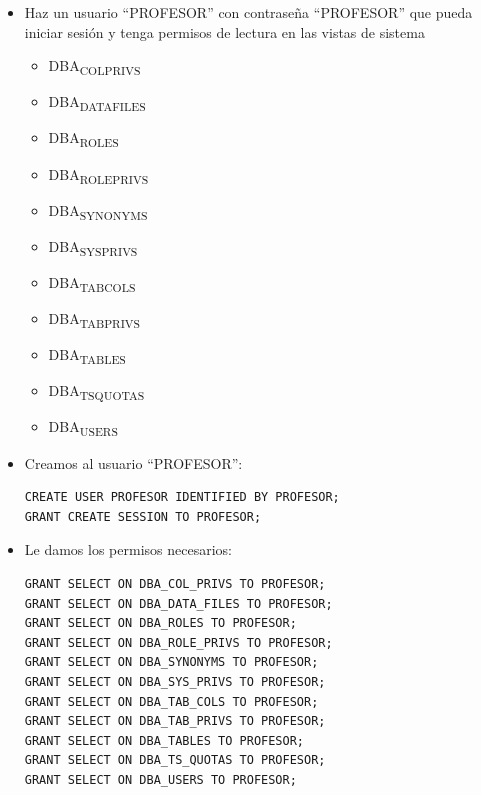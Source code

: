 \documentclass[11pt]{article}
\begin{document}
\begin{itemize}
\item Haz un usuario ``PROFESOR'' con contraseña ``PROFESOR'' que pueda iniciar sesión y tenga permisos de lectura en las vistas de sistema
\begin{itemize}
\item DBA\textsubscript{COL}\textsubscript{PRIVS}
\item DBA\textsubscript{DATA}\textsubscript{FILES}
\item DBA\textsubscript{ROLES}
\item DBA\textsubscript{ROLE}\textsubscript{PRIVS}
\item DBA\textsubscript{SYNONYMS}
\item DBA\textsubscript{SYS}\textsubscript{PRIVS}
\item DBA\textsubscript{TAB}\textsubscript{COLS}
\item DBA\textsubscript{TAB}\textsubscript{PRIVS}
\item DBA\textsubscript{TABLES}
\item DBA\textsubscript{TS}\textsubscript{QUOTAS}
\item DBA\textsubscript{USERS}
\end{itemize}

\item Creamos al usuario ``PROFESOR'':

\begin{verbatim}
CREATE USER PROFESOR IDENTIFIED BY PROFESOR;
GRANT CREATE SESSION TO PROFESOR;
\end{verbatim}

\item Le damos los permisos necesarios:

\begin{verbatim}
GRANT SELECT ON DBA_COL_PRIVS TO PROFESOR;
GRANT SELECT ON DBA_DATA_FILES TO PROFESOR;
GRANT SELECT ON DBA_ROLES TO PROFESOR;
GRANT SELECT ON DBA_ROLE_PRIVS TO PROFESOR;
GRANT SELECT ON DBA_SYNONYMS TO PROFESOR;
GRANT SELECT ON DBA_SYS_PRIVS TO PROFESOR;
GRANT SELECT ON DBA_TAB_COLS TO PROFESOR;
GRANT SELECT ON DBA_TAB_PRIVS TO PROFESOR;
GRANT SELECT ON DBA_TABLES TO PROFESOR;
GRANT SELECT ON DBA_TS_QUOTAS TO PROFESOR;
GRANT SELECT ON DBA_USERS TO PROFESOR;
\end{verbatim}
\end{itemize}
\end{document}
